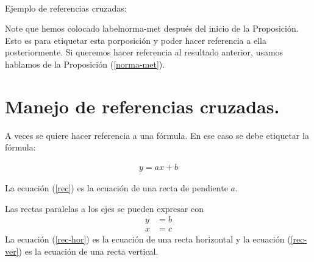 \

Ejemplo de referencias cruzadas:

Note que hemos colocado label{norma-met} despu\'es del inicio de la Proposici\'on.   Esto es
para etiquetar esta porposici\'on y poder hacer referencia a ella posteriormente. Si queremos
hacer referencia al resultado anterior, usamos hablamos de la Proposici\'on
(\ref{norma-met}).


\section{Manejo de referencias cruzadas.}

A veces se quiere hacer referencia a una f\'ormula. En ese caso se debe etiquetar la
f\'ormula:

\begin{align}
y = ax + b \label{rec}
\end{align}

La ecuaci\'on (\ref{rec}) es la ecuaci\'on de una recta de pendiente $a$.

Las rectas paralelas a los ejes se pueden expresar con
\begin{align}
y & = b \label{rec-hor}\\
x & = c \label{rec-ver}
\end{align}
La ecuaci\'on (\ref{rec-hor}) es la ecuaci\'on de una recta horizontal y la ecuaci\'on
(\ref{rec-ver}) es la ecuaci\'on de una recta vertical.
